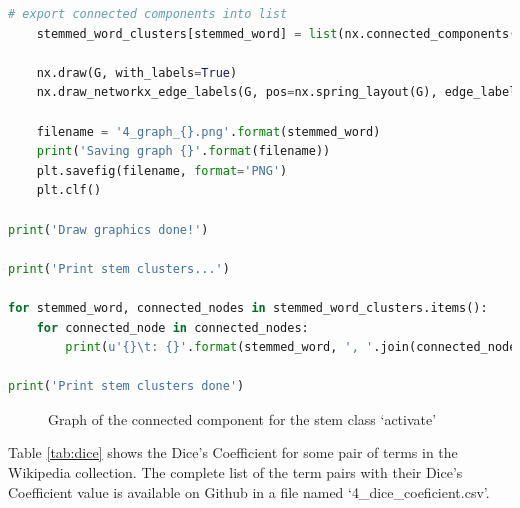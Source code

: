 \documentclass[letterpaper,11pt]{article}
\begin{document}
\begin{lstlisting}[language=python, caption={Creating Cluster using Dice's Coefficient}, label={lst:cluster}]
    # export connected components into list
    stemmed_word_clusters[stemmed_word] = list(nx.connected_components(G))

    nx.draw(G, with_labels=True)
    nx.draw_networkx_edge_labels(G, pos=nx.spring_layout(G), edge_labels=labels)

    filename = '4_graph_{}.png'.format(stemmed_word)
    print('Saving graph {}'.format(filename))
    plt.savefig(filename, format='PNG')
    plt.clf()

print('Draw graphics done!')

print('Print stem clusters...')

for stemmed_word, connected_nodes in stemmed_word_clusters.items():
    for connected_node in connected_nodes:
        print(u'{}\t: {}'.format(stemmed_word, ', '.join(connected_node)))

print('Print stem clusters done')


\end{lstlisting}

\begin{figure}[H]
	\centering
	\caption{Graph of the connected component for the stem class `activate'}
	\label{fig:4_graph_activate}
\end{figure}

Table \ref{tab:dice} shows the Dice's Coefficient for some pair of terms in the Wikipedia collection. The complete list of the term pairs with their Dice's Coefficient value is available on Github in a file named `4\_dice\_coeficient.csv'. 
\end{document}
